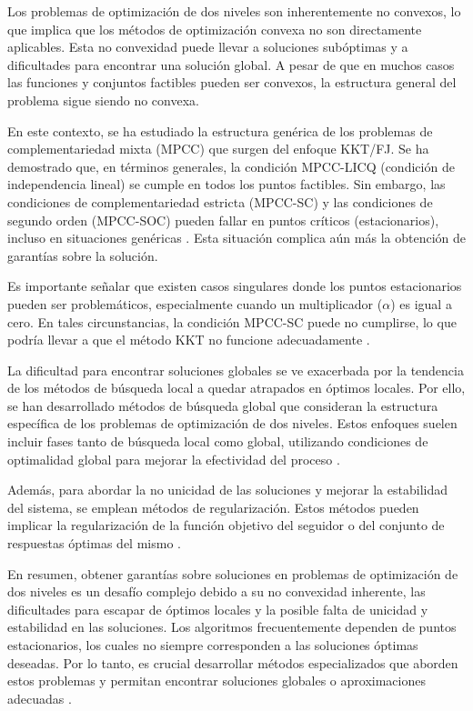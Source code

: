 Los problemas de optimización de dos niveles son inherentemente no convexos, lo que implica que los métodos de optimización convexa no son directamente aplicables. Esta no convexidad puede llevar a soluciones subóptimas y a dificultades para encontrar una solución global. A pesar de que en muchos casos las funciones y conjuntos factibles pueden ser convexos, la estructura general del problema sigue siendo no convexa.

En este contexto, se ha estudiado la estructura genérica de los problemas de complementariedad mixta (MPCC) que surgen del enfoque KKT/FJ. Se ha demostrado que, en términos generales, la condición MPCC-LICQ (condición de independencia lineal) se cumple en todos los puntos factibles. Sin embargo, las condiciones de complementariedad estricta (MPCC-SC) y las condiciones de segundo orden (MPCC-SOC) pueden fallar en puntos críticos (estacionarios), incluso en situaciones genéricas \cite{Allende2012SolvingBP}. Esta situación complica aún más la obtención de garantías sobre la solución.

Es importante señalar que existen casos singulares donde los puntos estacionarios pueden ser problemáticos, especialmente cuando un multiplicador (\(\alpha\)) es igual a cero. En tales circunstancias, la condición MPCC-SC puede no cumplirse, lo que podría llevar a que el método KKT no funcione adecuadamente \cite{Allende2012SolvingBP}.

La dificultad para encontrar soluciones globales se ve exacerbada por la tendencia de los métodos de búsqueda local a quedar atrapados en óptimos locales. Por ello, se han desarrollado métodos de búsqueda global que consideran la estructura específica de los problemas de optimización de dos niveles. Estos enfoques suelen incluir fases tanto de búsqueda local como global, utilizando condiciones de optimalidad global para mejorar la efectividad del proceso \cite{DempeyZemkoho2020}.

Además, para abordar la no unicidad de las soluciones y mejorar la estabilidad del sistema, se emplean métodos de regularización. Estos métodos pueden implicar la regularización de la función objetivo del seguidor o del conjunto de respuestas óptimas del mismo \cite{DempeyZemkoho2020}.

En resumen, obtener garantías sobre soluciones en problemas de optimización de dos niveles es un desafío complejo debido a su no convexidad inherente, las dificultades para escapar de óptimos locales y la posible falta de unicidad y estabilidad en las soluciones. Los algoritmos frecuentemente dependen de puntos estacionarios, los cuales no siempre corresponden a las soluciones óptimas deseadas. Por lo tanto, es crucial desarrollar métodos especializados que aborden estos problemas y permitan encontrar soluciones globales o aproximaciones adecuadas \cite{DempeyZemkoho2020}.


